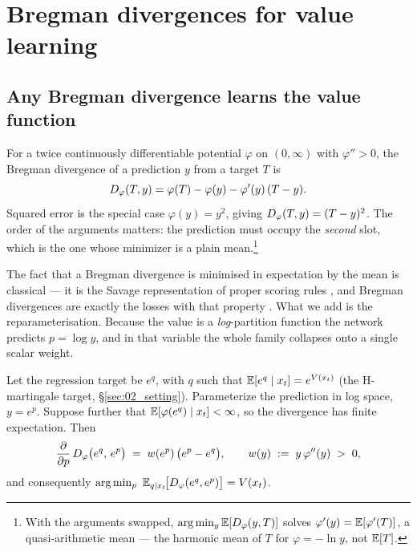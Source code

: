 \section{Bregman divergences for value learning}
\label{sec:04_bregman}

\subsection{Any Bregman divergence learns the value function}

For a twice continuously differentiable potential $\varphi$ on $(0,\infty)$
with $\varphi''>0$, the
Bregman divergence \citep{bregman1967relaxation} of a prediction $y$ from a
target $T$ is
\begin{equation}
  D_{\varphi}(T, y) = \varphi(T) - \varphi(y) - \varphi'(y)\,(T - y).
  \label{eq:bregman-def}
\end{equation}
Squared error is the special case $\varphi(y)=y^{2}$, giving
$D_{\varphi}(T,y)=(T-y)^{2}$. The order of the arguments matters: the prediction must
occupy the \emph{second} slot, which is the one whose minimizer is a plain
mean.\footnote{With the arguments swapped, $\arg\min_y\mathbb{E}[D_{\varphi}(y,T)]$ solves
$\varphi'(y)=\mathbb{E}[\varphi'(T)]$, a quasi-arithmetic mean --- the harmonic mean of
$T$ for $\varphi=-\ln y$, not $\mathbb{E}[T]$.}

The fact that a Bregman divergence is minimised in expectation by the mean is
classical --- it is the Savage representation of proper scoring rules
\citep{savage1971elicitation,gneiting2007proper}, and Bregman divergences are
exactly the losses with that property \citep{banerjee2005clustering}. What we add is the reparameterisation. Because the value is a
\emph{log}-partition function the network predicts $p=\log y$, and in that
variable the whole family collapses onto a single scalar weight.

\begin{lemma}
\label{lem:minimizer}
Let the regression target be $e^{q}$, with $q$ such that
$\mathbb{E}[e^{q}\mid x_t]=e^{V(x_t)}$ (the H-martingale target,
\S\ref{sec:02_setting}). Parameterize the prediction in log space, $y=e^{p}$.
Suppose further that $\mathbb{E}[\varphi(e^{q})\mid x_t]<\infty$, so the divergence has
finite expectation. Then
\begin{equation}
  \frac{\partial}{\partial p}\,D_{\varphi}\big(e^{q},\,e^{p}\big)
  \;=\; w(e^{p})\,\big(e^{p}-e^{q}\big),
  \qquad
  w(y) \;:=\; y\,\varphi''(y) \;>\; 0,
  \label{eq:weight-grad}
\end{equation}
and consequently
$\arg\min_{p}\ \mathbb{E}_{q\mid x_t}\!\big[D_{\varphi}(e^{q},e^{p})\big] = V(x_t)$.
\end{lemma}

